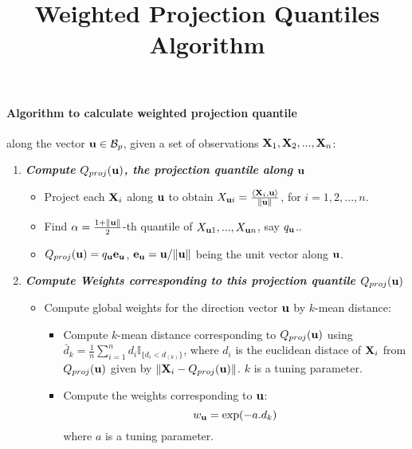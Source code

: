 \documentclass{article}
\title{Weighted Projection Quantiles Algorithm}
\begin{document}
\maketitle

\paragraph{Algorithm to calculate weighted projection quantile} along the vector ${\bf{u}} \in\mathcal B_p$, given a set of observations ${\mathbf{X}}_1,{\mathbf{X}}_2,...,{\mathbf{X}}_n$:

\begin{enumerate}

\item \textbf{\textit{Compute $Q_{proj}({\bf{u}})$, the projection quantile along ${\bf{u}}$}}

\begin{itemize}
\item Project each ${\mathbf{X}}_i$ along ${\bf{u}}$ to obtain $X_{{\bf{u}} i}=\frac{\langle{\mathbf{X}}_i,{\bf{u}}\rangle}{\|{\bf{u}}\|}$, for $i=1,2,...,n$.
\item Find $\alpha=\frac{1+\|{\bf{u}}\|}{2}$-th quantile of $X_{{\bf{u}} 1},...,X_{{\bf{u}} n}$, say $q_{\bf{u}}$..
\item $Q_{proj}({\bf{u}})=q_{\bf{u}}{\bf{e}}_{\bf{u}}$, ${\bf{e}}_{\bf{u}}={\bf{u}}/\|{\bf{u}}\|$ being the unit vector along ${\bf{u}}$.

\end{itemize}

\item \textit{\textbf{Compute Weights corresponding to this projection quantile $Q_{proj}({\bf{u}})$}}

\begin{itemize}

\item Compute global weights for the direction vector ${\bf{u}}$ by $k$-mean distance:

\begin{itemize}
\item Compute $k$-mean distance corresponding to $Q_{proj}({\bf{u}})$ using $\bar d_k=\frac{1}{n}\sum_{i=1}^nd_i\mathbb{I}_{\{d_i<d_{(k)}\}}$, where $d_i$ is the euclidean distace of ${\mathbf{X}}_i$ from $Q_{proj}({\bf{u}})$ given by $\|{\mathbf{X}}_i-Q_{proj}({\bf{u}})\|$. $k$ is a tuning parameter.\\

\item Compute the weights corresponding to ${\bf{u}}$:
$$w_{\bf{u}}=\exp(-a.d_k)$$
where $a$ is a tuning parameter. 
\end{itemize}


\end{itemize}
\end{enumerate}
\end{document}
